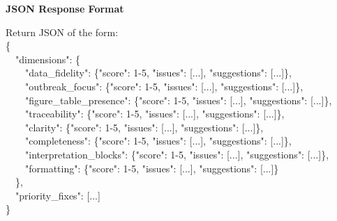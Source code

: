 \begin{tcolorbox}
\begin{tcolorbox}[
    enhanced,
    colback=gray!5,
    colframe=gray!20,
    boxrule=0pt,
    leftrule=3pt,
    arc=0pt,
    left=6pt, right=6pt, top=4pt, bottom=4pt
]
{\small\textbf{\textcolor{gray!70!black}{JSON Response Format}}}

\vspace{2pt}
{\small\ttfamily
Return JSON of the form:\\[6pt]
\{\\
\ \ "dimensions": \{\\
\ \ \ \ "data\_fidelity": \{"score": 1-5, "issues": [...], "suggestions": [...]\},\\
\ \ \ \ "outbreak\_focus": \{"score": 1-5, "issues": [...], "suggestions": [...]\},\\
\ \ \ \ "figure\_table\_presence": \{"score": 1-5, "issues": [...], "suggestions": [...]\},\\
\ \ \ \ "traceability": \{"score": 1-5, "issues": [...], "suggestions": [...]\},\\
\ \ \ \ "clarity": \{"score": 1-5, "issues": [...], "suggestions": [...]\},\\
\ \ \ \ "completeness": \{"score": 1-5, "issues": [...], "suggestions": [...]\},\\
\ \ \ \ "interpretation\_blocks": \{"score": 1-5, "issues": [...], "suggestions": [...]\},\\
\ \ \ \ "formatting": \{"score": 1-5, "issues": [...], "suggestions": [...]\}\\
\ \ \},\\
\ \ "priority\_fixes": [...]\\
\}
}
\end{tcolorbox}

\end{tcolorbox}


